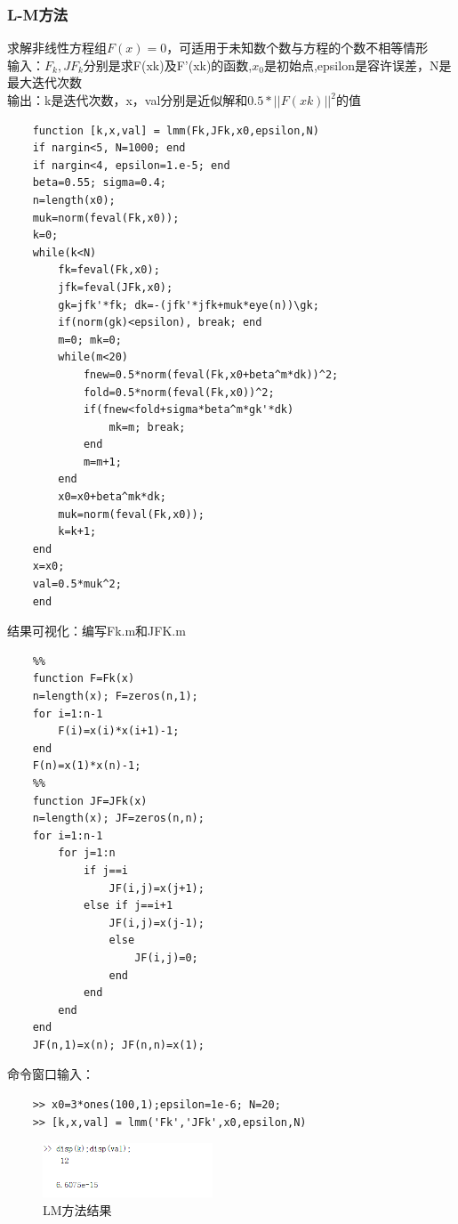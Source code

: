 \documentclass[12pt]{article} %
\begin{document}
	\subsubsection{L-M方法}
	求解非线性方程组$F(x)=0$，可适用于未知数个数与方程的个数不相等情形\\
	\indent 输入：$F_k,JF_k$分别是求F(xk)及F'(xk)的函数,$x_0$是初始点,epsilon是容许误差，N是最大迭代次数\\
	\indent 输出：k是迭代次数，x，val分别是近似解和$0.5*||F(xk)||^2$的值
	\begin{lstlisting}
	function [k,x,val] = lmm(Fk,JFk,x0,epsilon,N)
	if nargin<5, N=1000; end
	if nargin<4, epsilon=1.e-5; end
	beta=0.55; sigma=0.4;
	n=length(x0);
	muk=norm(feval(Fk,x0));
	k=0;
	while(k<N)
		fk=feval(Fk,x0);
		jfk=feval(JFk,x0);
		gk=jfk'*fk; dk=-(jfk'*jfk+muk*eye(n))\gk;
		if(norm(gk)<epsilon), break; end
		m=0; mk=0;
		while(m<20)
			fnew=0.5*norm(feval(Fk,x0+beta^m*dk))^2;
			fold=0.5*norm(feval(Fk,x0))^2;
			if(fnew<fold+sigma*beta^m*gk'*dk)
				mk=m; break;
			end
			m=m+1;
		end
		x0=x0+beta^mk*dk;
		muk=norm(feval(Fk,x0));
		k=k+1;
	end
	x=x0;
	val=0.5*muk^2;
	end
	\end{lstlisting}
	\indent 结果可视化：编写Fk.m和JFK.m
	\begin{lstlisting}
	%%
	function F=Fk(x)
	n=length(x); F=zeros(n,1);
	for i=1:n-1
		F(i)=x(i)*x(i+1)-1;
	end
	F(n)=x(1)*x(n)-1;
	%%
	function JF=JFk(x)
	n=length(x); JF=zeros(n,n);
	for i=1:n-1
		for j=1:n
			if j==i
				JF(i,j)=x(j+1);
			else if j==i+1
				JF(i,j)=x(j-1);
				else
					JF(i,j)=0;
				end
			end
		end
	end
	JF(n,1)=x(n); JF(n,n)=x(1);
	\end{lstlisting}
	\indent 命令窗口输入：
	\begin{lstlisting}
	>> x0=3*ones(100,1);epsilon=1e-6; N=20;
	>> [k,x,val] = lmm('Fk','JFk',x0,epsilon,N)
	\end{lstlisting}
\begin{figure}[ht]
	\centering
	\includegraphics[width=0.45\textwidth]{lmm.png}
	\caption{LM方法结果}
	\label{fig:fig1}
\end{figure}
\end{document}
